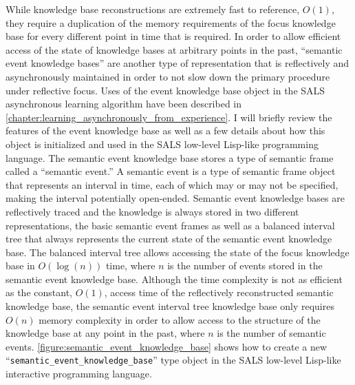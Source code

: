 While knowledge base reconstructions are extremely fast to reference,
$O(1)$, they require a duplication of the memory requirements of the
focus knowledge base for every different point in time that is
required.  In order to allow efficient access of the state of
knowledge bases at arbitrary points in the past, ``semantic event
knowledge bases'' are another type of representation that is
reflectively and asynchronously maintained in order to not slow down
the primary procedure under reflective focus.  Uses of the event
knowledge base object in the SALS asynchronous learning algorithm have
been described in
{\mbox{\autoref{chapter:learning_asynchronously_from_experience}}}.  I
will briefly review the features of the event knowledge base as well
as a few details about how this object is initialized and used in the
SALS low-level Lisp-like programming language.  The semantic event
knowledge base stores a type of semantic frame called a ``semantic
event.''  A semantic event is a type of semantic frame object that
represents an interval in time, each of which may or may not be
specified, making the interval potentially open-ended.  Semantic event
knowledge bases are reflectively traced and the knowledge is always
stored in two different representations, the basic semantic event
frames as well as a balanced interval tree that always represents the
current state of the semantic event knowledge base.  The balanced
interval tree allows accessing the state of the focus knowledge base
in $O(\log{(n)})$ time, where $n$ is the number of events stored in
the semantic event knowledge base.  Although the time complexity is
not as efficient as the constant, $O(1)$, access time of the
reflectively reconstructed semantic knowledge base, the semantic event
interval tree knowledge base only requires $O(n)$ memory complexity in
order to allow access to the structure of the knowledge base at any
point in the past, where $n$ is the number of semantic events.
{\mbox{\autoref{figure:semantic_event_knowledge_base}}} shows how to
create a new ``{\tt{semantic\_event\_knowledge\_base}}'' type object
in the SALS low-level Lisp-like interactive programming language.

